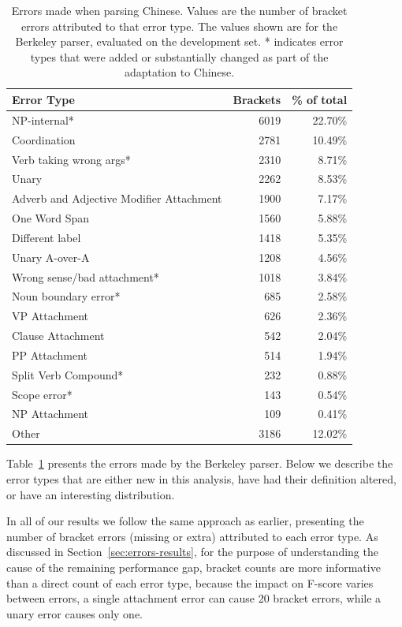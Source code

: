 \begin{table}
\centering
\begin{tabular}{lrr}
  \hline
  Error Type & Brackets & \% of total \\
  \hline
  \hline
              NP-internal* & 6019 & 22.70\% \\
              Coordination & 2781 & 10.49\% \\
   Verb taking wrong args* & 2310 &  8.71\% \\
                     Unary & 2262 &  8.53\% \\
Adverb and Adjective Modifier Attachment & 1900 &  7.17\% \\
             One Word Span & 1560 &  5.88\% \\
           Different label & 1418 &  5.35\% \\
            Unary A-over-A & 1208 &  4.56\% \\
   Wrong sense/bad attachment* & 1018 &  3.84\% \\
      Noun boundary error* &  685 &  2.58\% \\
             VP Attachment &  626 &  2.36\% \\
         Clause Attachment &  542 &  2.04\% \\
             PP Attachment &  514 &  1.94\% \\
      Split Verb Compound* &  232 &  0.88\% \\
              Scope error* &  143 &  0.54\% \\
             NP Attachment &  109 &  0.41\% \\
                     Other & 3186 & 12.02\% \\
\hline
\end{tabular}
\caption[Breakdown of errors in Chinese parsing.]{ \label{tab:errors} 
  Errors made when parsing Chinese. Values are the number of bracket errors
  attributed to that error type. The values shown are for the Berkeley parser,
  evaluated on the development set. * indicates error types that were added or
  substantially changed as part of the adaptation to Chinese.
}
\end{table}

Table~\ref{tab:errors} presents the errors made by the Berkeley parser.
Below we describe the error types that are either new in this analysis, have had their definition altered, or have an interesting distribution.

In all of our results we follow the same approach as earlier, presenting the number of bracket errors (missing or extra) attributed to each error type.
As discussed in Section~\ref{sec:errors-results}, for the purpose of understanding the cause of the remaining performance gap, bracket counts are more informative than a direct count of each error type, because the impact on \parseval F-score varies between errors, \myeg a single attachment error can cause 20 bracket errors, while a unary error causes only one.

